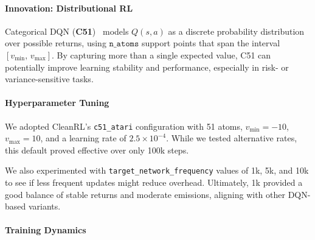 \paragraph{Innovation: Distributional RL}
Categorical DQN (\textbf{C51})~\cite{bellemare:distributional} models $Q(s,a)$ 
as a discrete probability distribution over possible returns, using $\texttt{n\_atoms}$ support points 
that span the interval $[v_{\mathrm{min}},\,v_{\mathrm{max}}]$. 
By capturing more than a single expected value, C51 can potentially improve learning stability 
and performance, especially in risk- or variance-sensitive tasks.

\paragraph{Hyperparameter Tuning}
We adopted CleanRL’s \texttt{c51\_atari} configuration with 51 atoms, $v_{\min}=-10$, $v_{\max}=10$, 
and a learning rate of $2.5\times10^{-4}$. While we tested alternative rates, 
this default proved effective over only 100k steps.  

We also experimented with \texttt{target\_network\_frequency} values of 1k, 5k, and 10k 
to see if less frequent updates might reduce overhead. 
Ultimately, 1k provided a good balance of stable returns and moderate emissions, 
aligning with other DQN-based variants.

\paragraph{Training Dynamics}

